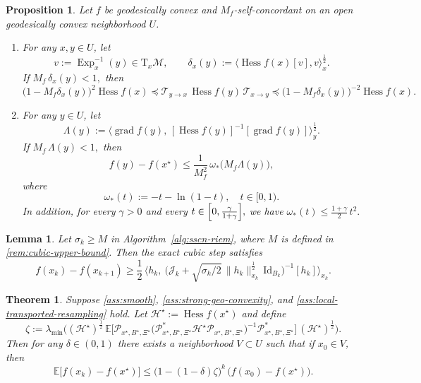 \documentclass[10pt,a4paper]{amsart}
\newtheorem{proposition}{Proposition}
\newtheorem{lemma}{Lemma}
\newtheorem{theorem}{Theorem}
\DeclareMathOperator{\Exp}{Exp}
\newcommand{\Hess}{\operatorname{Hess}}
\DeclareMathOperator{\grad}{grad}
\begin{document}
\begin{proposition}
\label{prop:self-concordant}
Let $f$ be geodesically convex and $M_f$-self-concordant on an open geodesically convex neighborhood $U$.
\begin{enumerate}
\item[1.] For any $x,y\in U$, let
\[
v:=\Exp_x^{-1}(y)\in \mathrm{T}_x\mathcal{M},
\qquad
\delta_x(y):=\big\langle \Hess f(x)[v],v\big\rangle_x^{\frac{1}{2}}.
\]
If
$
M_f\,\delta_x(y)<1,
$
then
\[
\bigl(1-M_f\delta_x(y)\bigr)^2 \Hess f(x)
\preceq
\mathcal T_{y\to x}\,\Hess f(y)\,\mathcal T_{x\to y}
\preceq
\bigl(1-M_f\delta_x(y)\bigr)^{-2}\Hess f(x).
\]

\item[2.] For any $y\in U$, let
\[
\Lambda(y):=
\big\langle
\grad f(y),\,
[\Hess f(y)]^{-1}[\grad f(y)]
\big\rangle_y^{\frac{1}{2}}.
\]
If
$
M_f\,\Lambda(y)<1,
$
then
\[
f(y)-f(x^\star)\le \frac{1}{M_f^2}\,\omega_*\bigl(M_f\Lambda(y)\bigr),
\]
where
\[
\omega_*(t):=-t-\ln(1-t),
\quad t\in[0,1).
\]
In addition, for every $\gamma>0$ and every
$
t\in\Bigl[0,\frac{\gamma}{1+\gamma}\Bigr],
$
we have
$
\omega_*(t)\le \frac{1+\gamma}{2}\,t^2.
$
\end{enumerate}
\end{proposition}

\begin{lemma}
\label{lem:manifold-descent-lemma}
Let $\sigma_k\ge M$ in Algorithm~\ref{alg:sscn-riem}, where $M$ is defined in \cref{rem:cubic-upper-bound}. Then the exact cubic step satisfies
\[
f(x_k)-f(x_{k+1})
\ge
\frac{1}{2}\,
\Big\langle
h_k,\
\bigl(\mathcal J_k+\sqrt{\sigma_k/2}\,\|h_k\|_{x_k}^{\frac{1}{2}}\,\mathrm{Id}_{B_k}\bigr)^{-1}[h_k]
\Big\rangle_{x_k}.
\]
\end{lemma}

\begin{theorem}
\label{thm:riem-local-exp}
Suppose \cref{ass:smooth}, \cref{ass:strong-geo-convexity}, and \cref{ass:local-transported-resampling} hold. Let $\mathcal{H}^\star:=\Hess f(x^\star)$ and define
\[
\zeta
:=
\lambda_{\min}\!\Big(
(\mathcal{H}^\star)^{\frac{1}{2}}\,
\mathbb E\big[
\mathcal P_{x^\star,B^\star,\Xi^\star}
\bigl(\mathcal P_{x^\star,B^\star,\Xi^\star}^{*}\mathcal{H}^\star\mathcal P_{x^\star,B^\star,\Xi^\star}\bigr)^{-1}
\mathcal P_{x^\star,B^\star,\Xi^\star}^{*}
\big]\,
(\mathcal{H}^\star)^{\frac{1}{2}}
\Big).
\]
Then for any $\delta\in(0,1)$ there exists a neighborhood $V\subset U$ such that if $x_0\in V$, then
\[
\mathbb E\bigl[f(x_k)-f(x^\star)\bigr]
\le
\bigl(1-(1-\delta)\zeta\bigr)^k\,\bigl(f(x_0)-f(x^\star)\bigr).
\]
\end{theorem}
\end{document}
